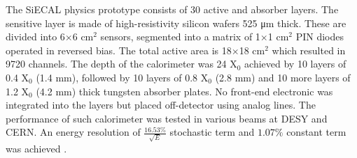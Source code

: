 The SiECAL physics prototype consists of 30 active and absorber layers. The sensitive layer is made of high-resistivity silicon wafers 525 \si{\micro\meter} thick. These are divided into 6$\times$6 cm$^2$ sensors, segmented into a matrix of 1$\times$1 cm$^2$ PIN diodes operated in reversed bias. The total active area is 18$\times$18 cm$^2$ which resulted in 9720 channels. The depth of the calorimeter was 24 X$_0$ achieved by 10 layers of 0.4 X$_0$ (1.4 mm), followed by 10 layers of 0.8 X$_0$ (2.8 mm) and 10 more layers of 1.2 X$_0$ (4.2 mm) thick tungsten absorber plates. No front-end electronic was integrated into the layers but placed off-detector using analog lines. The performance of such calorimeter was tested in various beams at DESY and CERN. An energy resolution of $\frac{16.53\%}{\sqrt{E}}$ stochastic term and $1.07\%$ constant term was achieved \cite{ADLOFF2009372}.

